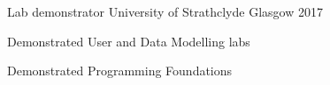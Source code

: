 \begin{cventries}
  \cventry
    {Lab demonstrator} %
    {University of Strathclyde} %
    {Glasgow} %
    {2017} %
    {
      \begin{cvitems} %
        \item {Demonstrated User and Data Modelling labs}
        \item {Demonstrated Programming Foundations}
      \end{cvitems}
    }

\end{cventries}
